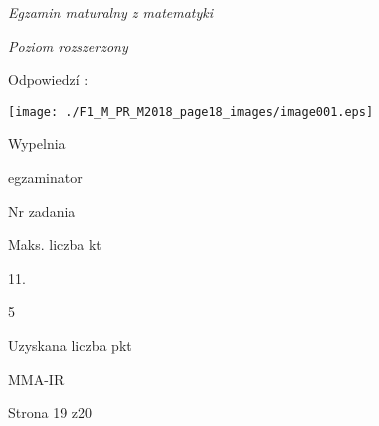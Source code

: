 \documentclass[a4paper,12pt]{article}
\begin{document}
{\it Egzamin maturalny z matematyki}

{\it Poziom rozszerzony}

Odpowiedzí :
\begin{center}
\texttt{[image: ./F1\_M\_PR\_M2018\_page18\_images/image001.eps]}
\end{center}
Wypelnia

egzaminator

Nr zadania

Maks. liczba kt

11.

5

Uzyskana liczba pkt

MMA-IR

Strona 19 z20
\end{document}
